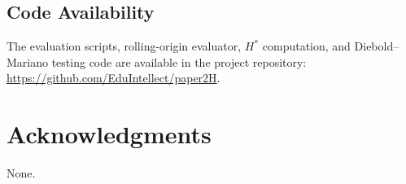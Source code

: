 \documentclass[pdflatex,sn-mathphys]{sn-jnl}
\begin{document}
\subsection*{Code Availability}
The evaluation scripts, rolling-origin evaluator, $H^*$ computation, and Diebold--Mariano testing code are available in the project repository: \url{https://github.com/EduIntellect/paper2H}.

\section*{Acknowledgments}
None.



\end{document}
